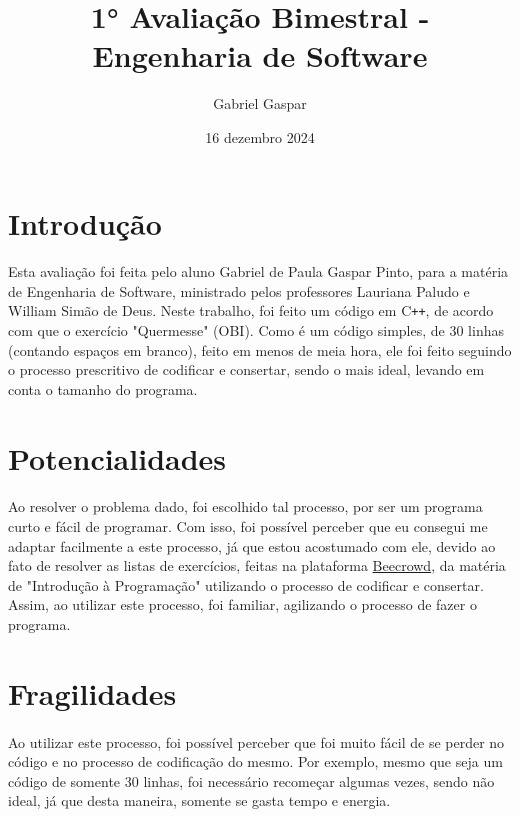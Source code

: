 \documentclass{article}
\title{1° Avaliação Bimestral - Engenharia de Software}
\author{Gabriel Gaspar}
\date{16 dezembro 2024}
\begin{document}
\maketitle

\section{Introdução}
\paragraph{} Esta avaliação foi feita pelo aluno Gabriel de Paula Gaspar Pinto, para a matéria de Engenharia de Software, ministrado pelos professores Lauriana Paludo e William Simão de Deus. Neste trabalho, foi feito um código em C\texttt{++}, de acordo com que o exercício "Quermesse" (OBI). Como é um código simples, de 30 linhas (contando espaços em branco), feito em menos de meia hora, ele foi feito seguindo o processo prescritivo de codificar e consertar, sendo o mais ideal, levando em conta o tamanho do programa. 

\section{Potencialidades}
\paragraph{} Ao resolver o problema dado, foi escolhido tal processo, por ser um programa curto e fácil de programar. Com isso, foi possível perceber que eu consegui me adaptar facilmente a este processo, já que estou acostumado com ele, devido ao fato de resolver as listas de exercícios, feitas na plataforma \href{https://judge.beecrowd.com}{Beecrowd}, da matéria de "Introdução à Programação" utilizando o processo de codificar e consertar. Assim, ao utilizar este processo, foi familiar, agilizando o processo de fazer o programa.

\section{Fragilidades}
\paragraph{} Ao utilizar este processo, foi possível perceber que foi muito fácil de se perder no código e no processo de codificação do mesmo. Por exemplo, mesmo que seja um código de somente 30 linhas, foi necessário recomeçar algumas vezes, sendo não ideal, já que desta maneira, somente se gasta tempo e energia.
\end{document}
